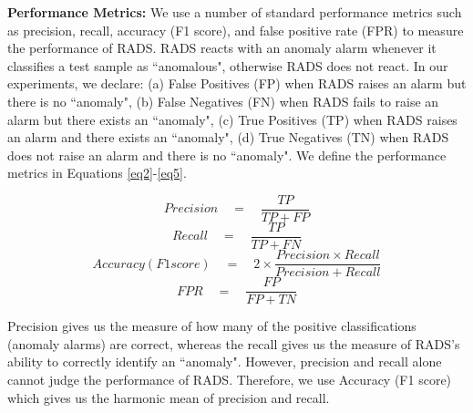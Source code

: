 \textbf{Performance Metrics:} 
We use a number of standard performance metrics such as precision, recall, accuracy (F1 score), and false positive rate (FPR) to measure the performance of RADS. 
RADS reacts with an anomaly alarm whenever it classifies a test sample as ``anomalous", otherwise RADS does not react. 
In our experiments, we declare: (a) False Positives (FP) when RADS raises an alarm but there is no ``anomaly", (b) False Negatives (FN) when RADS fails to raise an alarm but there exists an ``anomaly", (c) True Positives (TP) when RADS raises an alarm and there exists an ``anomaly", (d) True Negatives (TN) when RADS does not raise an alarm and there is no ``anomaly". We define the performance metrics in Equations \ref{eq2}-\ref{eq5}.

\begin{equation}\label{eq2}
    Precision \quad = \quad   \frac{TP}{TP+FP}
\end{equation}
\begin{equation}\label{eq3}
    Recall \quad = \quad   \frac{TP}{TP+FN}
\end{equation}
\begin{equation}\label{eq4}
    Accuracy (F1 score) \quad = \quad   2\times\frac{Precision \times Recall}{Precision+Recall}
\end{equation}
\begin{equation}\label{eq5}
    FPR \quad = \quad   \frac{FP}{FP+TN}
\end{equation}

Precision gives us the measure of how many of the positive classifications (anomaly alarms) are correct, whereas the recall gives us the measure of RADS's ability to correctly identify an ``anomaly". 
However, precision and recall alone cannot judge the performance of RADS. Therefore, we use Accuracy (F1 score) which gives us the harmonic mean of precision and recall.

